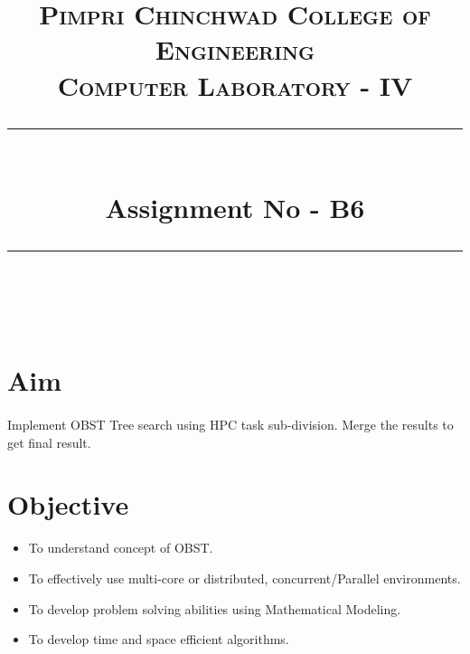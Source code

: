 \documentclass[a4paper,12pt]{article}
\title{
	\normalfont \normalsize 
	\textsc{Pimpri Chinchwad College of Engineering \\ 
		Computer Laboratory - IV} \\
	[10pt] 
	\rule{\linewidth}{0.5pt} \\[6pt] 
	\huge Assignment No - B6 \\
	\rule{\linewidth}{2pt}  \\[10pt]
}
\author{}
\date{\normalsize}
\newenvironment{codefont}{\fontfamily{ccr}\selectfont}{\par}
\begin{document}
\maketitle

\section{Aim}
	\paragraph{} Implement OBST Tree search using HPC task sub-division. Merge the results to get final result.
	
\section{Objective}
	\begin{itemize}
		\item To understand concept of OBST.  
		\item To effectively use multi-core or distributed, concurrent/Parallel environments.  
		\item To develop problem solving abilities using Mathematical Modeling.  
		\item To develop time and space efficient algorithms.  
	\end{itemize}
	
\end{document}
